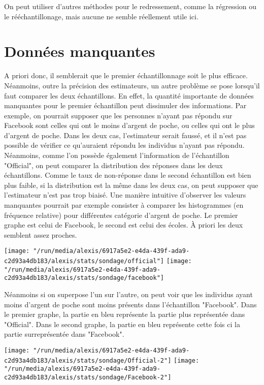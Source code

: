\documentclass[11pt,a4paper]{report}
\begin{document}
On peut utiliser d'autres méthodes pour le redressement, comme la régression ou le rééchantillonage, mais aucune ne semble réellement utile ici.

\section*{Données manquantes}

A priori donc, il semblerait que le premier échantillonnage soit le plus efficace. Néanmoins, outre la précision des estimateurs, un autre problème se pose lorsqu'il faut comparer les deux échantillons. En effet, la quantité importante de données manquantes pour le premier échantillon peut dissimuler des informations. Par exemple, on pourrait supposer que les personnes n'ayant pas répondu sur Facebook sont celles qui ont le moins d'argent de poche, ou celles qui ont le plus d'argent de poche. Dans les deux cas, l'estimateur serait faussé, et il n'est pas possible de vérifier ce qu'auraient répondu les individus n'ayant pas répondu. Néanmoins, comme l'on possède également l'information de l'échantillon "Official", on peut comparer la distribution des réponses dans les deux échantillons. Comme le taux de non-réponse dans le second échantillon est bien plus faible, si la distribution est la même dans les deux cas, on peut supposer que l'estimateur n'est pas trop biaisé. Une manière intuitive d'observer les valeurs manquantes pourrait par exemple consister à comparer les histogrammes (en fréquence relative) pour différentes catégorie d'argent de poche. Le premier graphe est celui de Facebook, le second est celui des écoles. À priori les deux semblent assez proches.

\texttt{[image: "/run/media/alexis/6917a5e2-e4da-439f-ada9-c2d93a4db183/alexis/stats/sondage/official"]}
\texttt{[image: "/run/media/alexis/6917a5e2-e4da-439f-ada9-c2d93a4db183/alexis/stats/sondage/facebook"]}

Néanmoins si on superpose l'un sur l'autre, on peut voir que les individus ayant moins d'argent de poche sont moins présents dans l'échantillon "Facebook". Dans le premier graphe, la partie en bleu représente la partie plus représentée dans "Official". Dans le second graphe, la partie en bleu représente cette fois ci la partie surreprésentée dans "Facebook".

\texttt{[image: "/run/media/alexis/6917a5e2-e4da-439f-ada9-c2d93a4db183/alexis/stats/sondage/Official-2"]}
\texttt{[image: "/run/media/alexis/6917a5e2-e4da-439f-ada9-c2d93a4db183/alexis/stats/sondage/Facebook-2"]}
\end{document}
